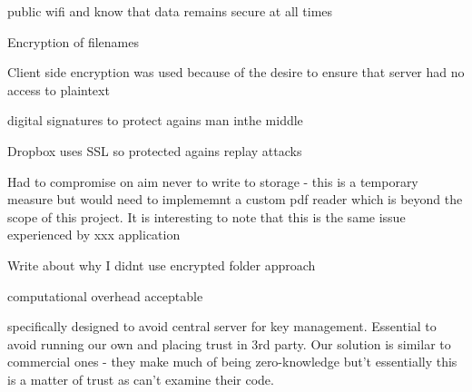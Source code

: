 public wifi and know that data remains secure at all times

 Encryption of filenames
 
 Client side encryption was used because of the desire to ensure that server had no access to plaintext
 
 digital signatures to protect agains man inthe middle
 
 Dropbox uses SSL so protected agains replay attacks
 
 Had to compromise on aim never to write to storage - this is a temporary measure but would need to implememnt a custom pdf reader which is beyond the scope of this project.  It is interesting to note that this is the same issue experienced by xxx application
 
 Write about why I didnt use encrypted folder approach
 
 computational overhead acceptable  
 
 
 specifically designed to avoid central server for key management.  Essential to avoid running our own and placing trust in 3rd party.  Our solution is similar to commercial ones - they make much of being zero-knowledge but't  essentially this is a matter of trust as can't examine their code.
 
 
 
 

